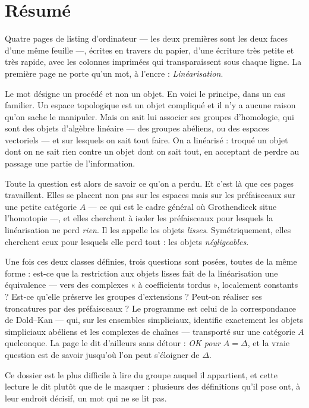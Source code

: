 \documentclass[11pt,a4paper]{article}
\begin{document}
\section*{Résumé}

\begin{resume}
Quatre pages de listing d'ordinateur --- les deux premières sont les deux faces
d'une même feuille ---, écrites en travers du papier, d'une écriture très petite
et très rapide, avec les colonnes imprimées qui transparaissent sous chaque
ligne. La première page ne porte qu'un mot, à l'encre :
\emph{Linéarisation}.

Le mot désigne un procédé et non un objet. En voici le principe, dans un cas
familier. Un espace topologique est un objet compliqué et il n'y a aucune raison
qu'on sache le manipuler. Mais on sait lui associer ses groupes d'homologie, qui
sont des objets d'algèbre linéaire --- des groupes abéliens, ou des espaces
vectoriels --- et sur lesquels on sait tout faire. On a linéarisé : troqué un
objet dont on ne sait rien contre un objet dont on sait tout, en acceptant de
perdre au passage une partie de l'information.

Toute la question est alors de savoir ce qu'on a perdu. Et c'est là que ces
pages travaillent. Elles se placent non pas sur les espaces mais sur les
préfaisceaux sur une petite catégorie $A$ --- ce qui est le cadre général où
Grothendieck situe l'homotopie ---, et elles cherchent à isoler les préfaisceaux
pour lesquels la linéarisation ne perd \emph{rien}. Il les appelle les objets
\emph{lisses}. Symétriquement, elles cherchent ceux pour lesquels elle perd
tout : les objets \emph{négligeables}.

Une fois ces deux classes définies, trois questions sont posées, toutes de la
même forme : est-ce que la restriction aux objets lisses fait de la
linéarisation une équivalence --- vers des complexes « à coefficients
tordus », localement constants ? Est-ce qu'elle préserve les groupes
d'extensions ? Peut-on réaliser ses troncatures par des préfaisceaux ? Le programme est celui de la correspondance de Dold--Kan --- qui,
sur les ensembles simpliciaux, identifie exactement les objets simpliciaux
abéliens et les complexes de chaînes --- transporté sur une catégorie $A$
quelconque. La page le dit d'ailleurs sans détour : \emph{OK pour $A =
\Delta$}, et la vraie question est de savoir jusqu'où l'on peut s'éloigner de
$\Delta$.

Ce dossier est le plus difficile à lire du groupe auquel il appartient, et
cette lecture le dit plutôt que de le masquer : plusieurs des définitions qu'il
pose ont, à leur endroit décisif, un mot qui ne se lit pas.

\end{resume}
\end{document}

